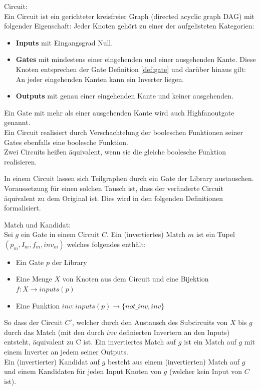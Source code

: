 \documentclass[11pt, a4paper, german]{article}
\begin{document}
\begin{definition}{Circuit:}\\
Ein Circuit ist ein gerichteter kreisfreier Graph (directed acyclic graph DAG) mit folgender Eigenschaft: Jeder Knoten gehört zu einer der aufgelisteten Kategorien: 
\begin{itemize}
\item {\bf Inputs }mit Eingangsgrad Null.
\item{\bf Gates} mit mindestens einer eingehenden und einer ausgehenden Kante.
Diese Knoten entsprechen der Gate Definition \ref{def:gate} und darüber hinaus gilt: An jeder eingehenden Kanten kann ein Inverter liegen.
\item{\bf Outputs} mit genau einer eingehenden Kante und keiner ausgehenden.
\end{itemize}
Ein Gate mit mehr als einer ausgehenden Kante wird auch Highfanoutgate genannt.\\
Ein Circuit realisiert durch Verschachtelung der booleschen Funktionen seiner Gates ebenfalls eine boolesche Funktion. \\
Zwei Circuits heißen äquivalent, wenn sie die gleiche boolesche Funktion realisieren.
\end{definition}

In einem Circuit lassen sich Teilgraphen durch ein Gate der Library austauschen. Voraussetzung für einen solchen Tausch ist, dass der veränderte Circuit äquivalent zu dem Original ist. Dies wird in den folgenden Definitionen formalisiert. 

\begin{definition}{Match und Kandidat:}\\
Sei $g$ ein Gate in einem Circuit $C$. Ein (invertiertes) Match $m$ ist ein Tupel $(p_m, I_m, f_m, inv_m)$ welches folgendes enthält:
\begin{itemize}
\item Ein Gate $p$ der Library
\item Eine Menge $X$ von Knoten aus dem Circuit und eine Bijektion $ f: X \rightarrow inputs(p)$
\item Eine Funktion $ inv : inputs(p) \rightarrow \{not\_inv , inv \}$
\end{itemize}
So dass der Circuit $C'$, welcher durch den Austausch des Subcircuits von $X$ bis $g$ durch das Match (mit den durch $inv$ definierten Invertern an den Inputs) entsteht, äquivalent zu C ist.
Ein invertiertes Match auf $g$ ist ein Match auf $g$ mit einem Inverter an jedem seiner Outputs.\\
Ein (invertierter) Kandidat auf $g$ besteht aus einem (invertierten) Match auf $g$ und einem Kandidaten für jeden Input Knoten von $g$ (welcher kein Input von $C$ ist).
\end{definition}
\end{document}
